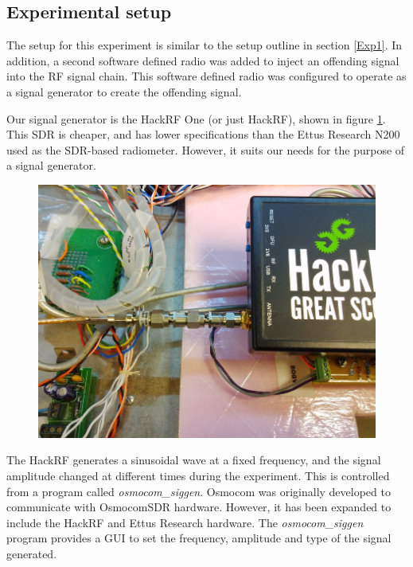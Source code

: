 \subsection{Experimental setup} \label{exp3_setup}

The setup for this experiment is similar to the setup outline in section \ref{Exp1}.  In addition, a second software defined radio was added to inject an offending signal into the RF signal chain.  This software defined radio was configured to operate as a signal generator to create the offending signal.  

Our signal generator is the HackRF One (or just HackRF), shown in figure \ref{HackRF}.  This SDR is cheaper, and has lower specifications than the Ettus Research N200 used as the SDR-based radiometer.  However, it suits our needs for the purpose of a signal generator.

\begin{figure}[h!tb] \centering

\includegraphics[width=\textwidth]{Images/Hack_RF.jpg}
\label{HackRF}
\end{figure} 

The HackRF generates a sinusoidal wave at a fixed frequency, and the signal amplitude changed at different times during the experiment.  This is controlled from a program called \emph{osmocom\_siggen}.  Osmocom was originally developed to communicate with OsmocomSDR hardware.  However, it has been expanded to include the HackRF and Ettus Research hardware.  The \emph{osmocom\_siggen} program provides a GUI to set the frequency, amplitude and type of the signal generated.  

